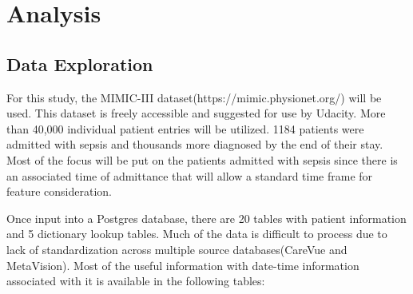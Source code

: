 \documentclass[11pt]{article}
\begin{document}
	\section{Analysis}
	\subsection{Data Exploration}
	For this study, the MIMIC-III dataset(https://mimic.physionet.org/) will be used. This dataset is freely accessible and suggested for use by Udacity. More than 40,000 individual patient entries will be utilized. 1184 patients were admitted with sepsis and thousands more diagnosed by the end of their stay. Most of the focus will be put on the patients admitted with sepsis since there is an associated time of admittance that will allow a standard time frame for feature consideration.
	
	Once input into a Postgres database, there are 20 tables with patient information and 5 dictionary lookup tables. Much of the data is difficult to process due to lack of standardization across multiple source databases(CareVue and MetaVision). Most of the useful information with date-time information associated with it is available in the following tables:
	
\end{document}
